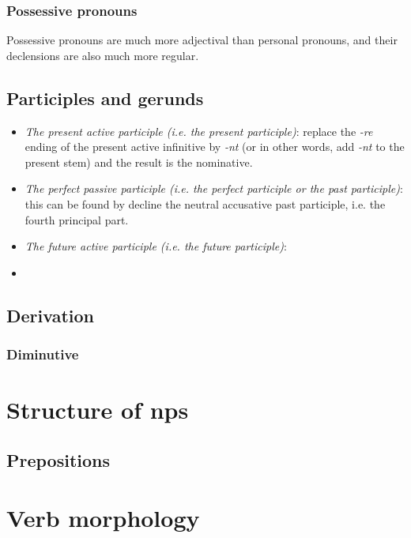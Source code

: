 \documentclass{article}
\newcommand*{\corpus}[1]{\emph{#1}}
\begin{document}
\subsubsection{Possessive pronouns}

Possessive pronouns are much more adjectival than personal pronouns,
and their declensions are also much more regular.

\subsection{Participles and gerunds}\label{sec:participle-gerund}

\begin{itemize}
    \item \emph{The present active participle (i.e. the present participle)}: 
    replace the \corpus{-re} ending of the present active infinitive by \corpus{-nt}
    (or in other words, add \corpus{-nt} to the present stem)
    and the result is the nominative. %
    \item \emph{The perfect passive participle (i.e. the perfect participle or the past participle)}:
    this can be found by decline the neutral accusative past participle, 
    i.e. the fourth principal part.
    \item \emph{The future active participle (i.e. the future participle)}:
    
    \item \emph{}
\end{itemize}

\subsection{Derivation} %

\subsubsection{Diminutive}

\section{Structure of \acl{np}s}

\subsection{Prepositions}

\section{Verb morphology}
\end{document}

